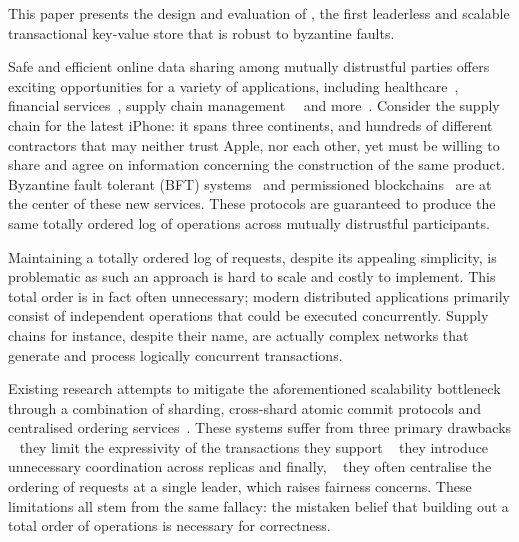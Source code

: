 This paper presents the design and evaluation of \sys{}, the
first leaderless and scalable transactional key-value store that is robust to byzantine faults.

Safe and efficient online data sharing among mutually distrustful
parties offers exciting opportunities for a variety of applications,
including healthcare~\cite{}, financial services~\cite{}, supply chain
management~~\cite{} and more~\cite{}. Consider the supply chain for the latest iPhone: it spans three continents, and hundreds of different contractors \cite{AppleSup} that may neither trust Apple, nor each other, yet must be willing to share and agree on information concerning the construction of the same product.
Byzantine fault tolerant (BFT)
systems~\cite{castro1999practical,martin2006fast,kotla2007zyzzyva,  gueta2018sbft,clement2009making,buchman2016tendermint,yin2019hotstuff,Clement09Upright,duan2014hbft, pires2018generalized,bessani2014state,lamport2011byzantizing,arun2019ezbft, malkhi2019flexible,duan2014hbft,yin2003separating, Guerraoui08Next, Kotla04High,liskov2010viewstamped} and permissioned blockchains~\cite{Hyperledger,EthereumQuorum, buchman2016tendermint, al2017chainspace,kokoris2018omniledger,gilad2017algorand, baudet2019state} are at the center of these new services. These protocols are guaranteed to
produce the same totally ordered log of operations across mutually distrustful
participants. 

Maintaining a totally ordered log of requests, despite its appealing simplicity, is problematic as such an approach is hard to scale and costly to implement. This total order is in fact often unnecessary; modern distributed applications primarily consist of independent operations that could be executed concurrently. Supply chains for instance, despite their name, are actually complex networks that generate and process logically concurrent transactions.

Existing research attempts to mitigate the aforementioned scalability bottleneck through a combination of sharding, cross-shard atomic commit protocols and centralised ordering services~\cite{kokoris2018omniledger,al2017chainspace,padilha2016callinicos}. These systems suffer from three primary drawbacks \one ~ they limit the expressivity of the transactions they support \two ~ they introduce unnecessary coordination across replicas and finally,
\three ~ they often centralise the ordering of requests at a single leader, which raises fairness  concerns. These limitations all stem from the same fallacy: the mistaken belief that building out a total order of operations is necessary for correctness. 
 

